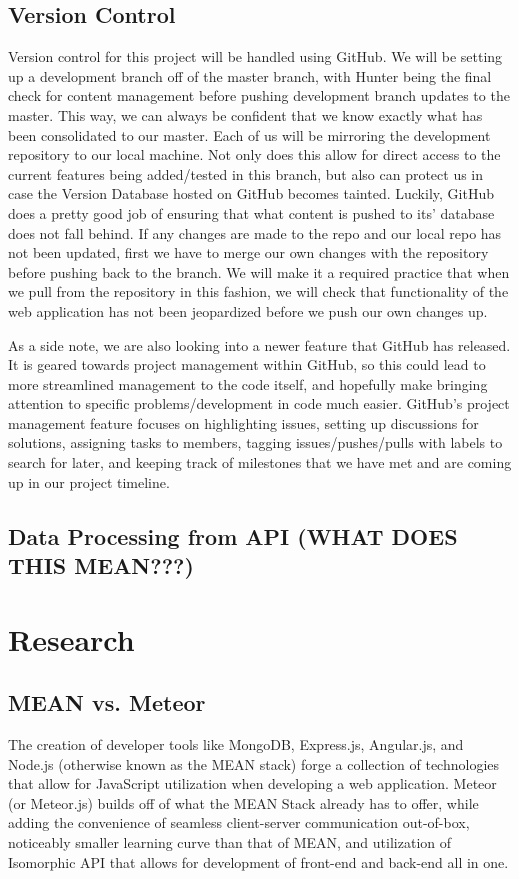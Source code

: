\documentclass[12pt,a4paper]{report}
\begin{document}
	\section{Version Control}
	Version control for this project will be handled using GitHub. We will be setting up a development branch off of the master branch, with Hunter being the final check for content management before pushing development branch updates to the master. This way, we can always be confident that we know exactly what has been consolidated to our master. Each of us will be mirroring the development repository to our local machine. Not only does this allow for direct access to the current features being added/tested in this branch, but also can protect us in case the Version Database hosted on GitHub becomes tainted. Luckily, GitHub does a pretty good job of ensuring that what content is pushed to its' database does not fall behind. If any changes are made to the repo and our local repo has not been updated, first we have to merge our own changes with the repository before pushing back to the branch. We will make it a required practice that when we pull from the repository in this fashion, we will check that functionality of the web application has not been jeopardized before we push our own changes up. \par
	As a side note, we are also looking into a newer feature that GitHub has released. It is geared towards project management within GitHub, so this could lead to more streamlined management to the code itself, and hopefully make bringing attention to specific problems/development in code much easier. GitHub's project management feature focuses on highlighting issues, setting up discussions for solutions, assigning tasks to members, tagging issues/pushes/pulls with labels to search for later, and keeping track of milestones that we have met and are coming up in our project timeline.
	\section{Data Processing from API (WHAT DOES THIS MEAN???)}

\newpage
\chapter*{Research}
	\section{MEAN vs. Meteor}
	The creation of developer tools like MongoDB, Express.js, Angular.js, and Node.js (otherwise known as the MEAN stack) forge a collection of technologies that allow for JavaScript utilization when developing a web application. Meteor (or Meteor.js) builds off of what the MEAN Stack already has to offer, while adding the convenience of seamless client-server communication out-of-box, noticeably smaller learning curve than that of MEAN, and utilization of Isomorphic API that allows for development of front-end and back-end all in one.
	
\end{document}
